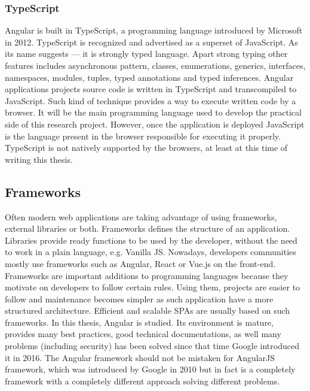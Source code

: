 \documentclass{article} %
\begin{document}
\subsubsection{TypeScript}
Angular is built in TypeScript, a programming language introduced by Microsoft in 2012. TypeScript is recognized and advertised as a superset of JavaScript. As its name suggests --- it is strongly typed language. Apart strong typing other features includes asynchronous pattern, classes, enumerations, generics, interfaces, namespaces, modules, tuples, typed annotations and typed inferences. Angular applications projects source code is written in TypeScript and transcompiled to JavaScript. Such kind of technique provides a way to execute written code by a browser. It will be the main programming language used to develop the practical side of this research project. However, once the application is deployed JavaScript is the language present in the browser responsible for executing it properly. TypeScript is not natively supported by the browsers, at least at this time of writing this thesis.
\subsection{Frameworks}
Often modern web applications are taking advantage of using frameworks, external libraries or both. Frameworks defines the structure of an application. Libraries provide ready functions to be used by the developer, without the need to work in a plain language, e.g. Vanilla JS. Nowadays, developers communities mostly use frameworks such as Angular, React or Vue.js on the front-end. Frameworks are important additions to programming languages because they motivate on developers to follow certain rules. Using them, projects are easier to follow and maintenance becomes simpler as such application have a more structured architecture. Efficient and scalable SPAs are usually based on such frameworks. In this thesis, Angular is studied. Its environment is mature, provides many best practices, good technical documentations, as well many problems (including security) has been solved since that time Google introduced it in 2016. The Angular framework should not be mistaken for AngularJS framework, which was introduced by Google in 2010 but in fact is a completely framework with a completely different approach solving different problems.
\end{document}
